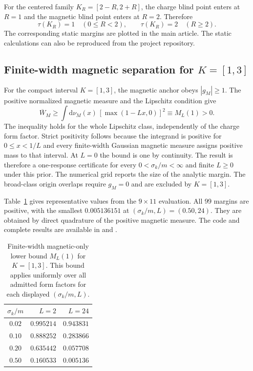\documentclass[12pt]{iopjournal}
\newcommand{\dd}{\mathrm d}
\newenvironment{ruledtabular}{\centering}{}
\newcommand{\colrule}{\hline}
\begin{document}
For the centered family $K_R=[2-R,2+R]$, the charge blind point enters at $R=1$ and the magnetic blind point enters at $R=2$. Therefore
\begin{equation}
\tau(K_R)=1\quad (0\le R<2),
\qquad
\tau(K_R)=2\quad (R\ge2).
\end{equation}
The corresponding static margins are plotted in the main article. The static calculations can also be reproduced from the project repository.

\subsection{Finite-width magnetic separation for $K=[1,3]$}
For the compact interval $K=[1,3]$, the magnetic anchor obeys $|g_M|\ge1$. The positive normalized magnetic measure and the Lipschitz condition give
\begin{equation}
\overline W_M\ge \int\dd\nu_M(x)\,[\max(1-Lx,0)]^2
\equiv M_L(1)>0.
\label{eq:supp-narrow-magnetic}
\end{equation}
The inequality holds for the whole Lipschitz class, independently of the charge form factor. Strict positivity follows because the integrand is positive for $0\le x<1/L$ and every finite-width Gaussian magnetic measure assigns positive mass to that interval. At $L=0$ the bound is one by continuity. The result is therefore a one-response certificate for every $0<\sigma_k/m<\infty$ and finite $L\ge0$ under this prior. The numerical grid reports the size of the analytic margin. The broad-class origin overlaps require $g_M=0$ and are excluded by $K=[1,3]$.

Table~\ref{tab:supp-narrow-magnetic} gives representative values from the $9\times11$ evaluation. All 99 margins are positive, with the smallest $0.005136151$ at $(\sigma_k/m,L)=(0.50,24)$. They are obtained by direct quadrature of the positive magnetic measure. The code and complete results are available in  and .
\begin{table}[h]
\caption{Finite-width magnetic-only lower bound $M_L(1)$ for $K=[1,3]$. This bound applies uniformly over all admitted form factors for each displayed $(\sigma_k/m,L)$.}
\label{tab:supp-narrow-magnetic}
\begin{ruledtabular}
\begin{tabular}{crr}
$\sigma_k/m$ & $L=2$ & $L=24$\\
\colrule
$0.02$ & $0.995214$ & $0.943831$\\
$0.10$ & $0.888252$ & $0.283866$\\
$0.20$ & $0.635442$ & $0.057708$\\
$0.50$ & $0.160533$ & $0.005136$\\
\end{tabular}
\end{ruledtabular}
\end{table}
\end{document}
